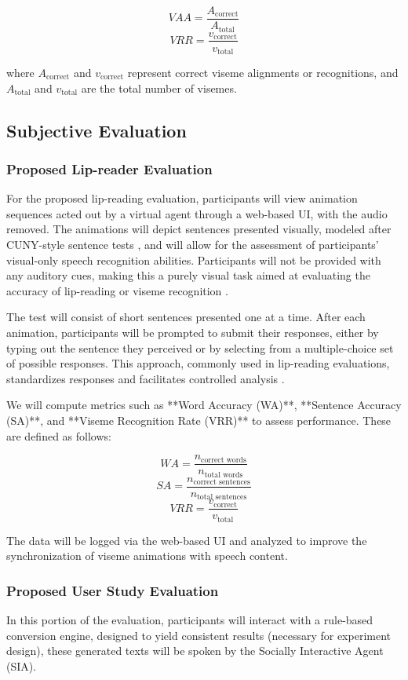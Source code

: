 \documentclass[12pt]{article}
\begin{document}
\[
VAA = \frac{A_{\text{correct}}}{A_{\text{total}}}
\]
\[
VRR = \frac{v_{\text{correct}}}{v_{\text{total}}}
\]

where $A_{\text{correct}}$ and $v_{\text{correct}}$ represent correct viseme alignments or recognitions, and $A_{\text{total}}$ and $v_{\text{total}}$ are the total number of visemes.

\subsection{Subjective Evaluation}
\subsubsection{Proposed Lip-reader Evaluation}

For the proposed lip-reading evaluation, participants will view animation sequences acted out by a virtual agent through a web-based UI, with the audio removed. The animations will depict sentences presented visually, modeled after CUNY-style sentence tests \cite{Altieri2011SomeL}, and will allow for the assessment of participants’ visual-only speech recognition abilities. Participants will not be provided with any auditory cues, making this a purely visual task aimed at evaluating the accuracy of lip-reading or viseme recognition \cite{Altieri2011SomeL}.

The test will consist of short sentences presented one at a time. After each animation, participants will be prompted to submit their responses, either by typing out the sentence they perceived or by selecting from a multiple-choice set of possible responses. This approach, commonly used in lip-reading evaluations, standardizes responses and facilitates controlled analysis \cite{Altieri2011SomeL}.

We will compute metrics such as **Word Accuracy (WA)**, **Sentence Accuracy (SA)**, and **Viseme Recognition Rate (VRR)** to assess performance. These are defined as follows:

\[
WA = \frac{n_{\text{correct words}}}{n_{\text{total words}}}
\]
\[
SA = \frac{n_{\text{correct sentences}}}{n_{\text{total sentences}}}
\]
\[
VRR = \frac{v_{\text{correct}}}{v_{\text{total}}}
\]

The data will be logged via the web-based UI and analyzed to improve the synchronization of viseme animations with speech content.

\subsubsection{Proposed User Study Evaluation}
In this portion of the evaluation, participants will interact with a rule-based conversion engine, designed to yield consistent results (necessary for experiment design), these generated texts will be spoken by the Socially Interactive Agent (SIA). 
\end{document}
